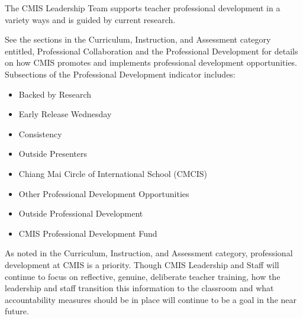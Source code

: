 \begin{findings}
The CMIS Leadership Team supports teacher professional development in a variety ways and is guided by current research. 

See the sections in the Curriculum, Instruction, and Assessment category entitled, Professional Collaboration and the Professional Development for details on how CMIS promotes and implements professional development opportunities. Subsections of the Professional Development indicator includes:

\begin{itemize}
\item Backed by Research
\item Early Release Wednesday
\item Consistency 
\item Outside Presenters
\item Chiang Mai Circle of International School (CMCIS) 
\item Other Professional Development Opportunities
\item Outside Professional Development 
\item CMIS Professional Development Fund 
\end{itemize}


As noted in the Curriculum, Instruction, and Assessment category, professional development at CMIS is a priority. Though CMIS Leadership and Staff will continue to focus on reflective, genuine, deliberate teacher training, how the leadership and staff transition this information to the classroom and what accountability measures should be in place will continue to be a goal in the near future.
\end{findings}



